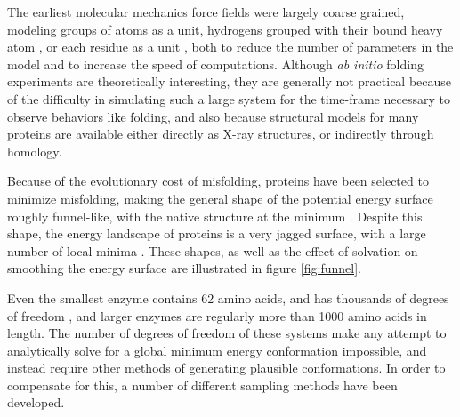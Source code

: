 The earliest molecular mechanics force fields were largely coarse grained, modeling groups of atoms as a unit, hydrogens grouped with their bound heavy atom \cite{jorgensen1988opls}, or each residue as a unit \cite{lee1999energy}, both to reduce the number of parameters in the model and to increase the speed of computations.
Although {\it ab initio} folding experiments are theoretically interesting, they are generally not practical because of the difficulty in simulating such a large system for the time-frame necessary to observe behaviors like folding, and also because structural models for many proteins are available either directly as X-ray structures, or indirectly through homology.

Because of the evolutionary cost of misfolding, proteins have been selected to minimize misfolding, making the general shape of the potential energy surface roughly funnel-like, with the native structure at the minimum \cite{leopold1992protein}.
Despite this shape, the energy landscape of proteins is a very jagged surface, with a large number of local minima \cite{tsai1999folding}.
These shapes, as well as the effect of solvation on smoothing the energy surface are illustrated in figure \ref{fig:funnel}.



Even the smallest enzyme contains 62 amino acids, and has thousands of degrees of freedom \cite{chen19924}, and larger enzymes are regularly more than 1000 amino acids in length.
The number of degrees of freedom of these systems make any attempt to analytically solve for a global minimum energy conformation impossible, and instead require other methods of generating plausible conformations.
In order to compensate for this, a number of different sampling methods have been developed.
